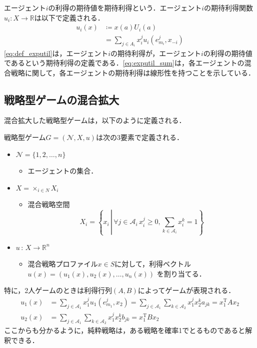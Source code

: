 \documentclass{jsreport}
\begin{document}
エージェント$i$の利得の期待値を期待利得という．エージェント$i$の期待利得関数$u_i: X \to \mathbb{R}$は以下で定義される．
\begin{align}
  u_i(x) &\coloneqq x(a)U_i(a) \label{eq:def_exputil} \\
  &= \sum_{j \in A_i} x_i^j u_i(e_{m_i}^j, x_{-i}) \label{eq:exputil_sum}
\end{align}
\eqref{eq:def_exputil}は，エージェント$i$の期待利得が，エージェント$i$の利得の期待値であるという期待利得の定義である．\eqref{eq:exputil_sum}は，各エージェントの混合戦略に関して，各エージェントの期待利得は線形性を持つことを示している．
\subsection{戦略型ゲームの混合拡大}
混合拡大した戦略型ゲームは，以下のように定義される．
\begin{screen}
  \begin{defi}[戦略型ゲーム]
  戦略型ゲーム$G = (\mathcal{N}, X, u)$は次の3要素で定義される．
  \begin{itemize}
    \item $\mathcal{N} = \{1, 2, \ldots, n\}$
    \begin{itemize}
      \item エージェントの集合．
    \end{itemize}
    \item $X = \times_{i \in N} X_i$
    \begin{itemize}
      \item 混合戦略空間
      \begin{equation}
        X_i = \left\{x_i \, \left| \, \forall j \in \mathcal{A}_i \, x_i^j \geq 0, \sum_{k \in \mathcal{A}_i} x_i^k = 1\right.\right\} \nonumber
      \end{equation}
    \end{itemize}
    \item $u \, : \, X \rightarrow \mathbb{R}^n$
    \begin{itemize}
      \item 混合戦略プロファイル$x \in S$に対して，利得ベクトル
      $u(x) = (u_1(x), u_2(x), \ldots, u_n(x))$
      を割り当てる．
    \end{itemize}
  \end{itemize}
  \end{defi}
\end{screen}

特に，2人ゲームのときは利得行列$(A, B)$によってゲームが表現される．
\begin{align}
  u_1(x) &= \sum_{j \in \mathcal{A}_1} x_1^j u_1(e_{m_1}^j, x_2) = \sum_{j \in \mathcal{A}_1} \sum_{k \in \mathcal{A}_2} x_1^j x_2^k a_{jk} = x_1^{\mathrm{T}}Ax_2 \nonumber \\
  u_2(x) &= \sum_{j \in \mathcal{A}_1} \sum_{k \in \mathcal{A}_2} x_1^j x_2^k b_{jk} = x_1^{\mathrm{T}} B x_2 \nonumber
\end{align}
ここからも分かるように，純粋戦略は，ある戦略を確率1でとるものであると解釈できる．
\end{document}
